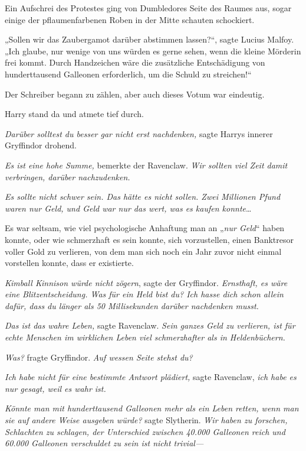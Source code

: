 {Ein Aufschrei des Protestes ging von Dumbledores Seite des Raumes aus, sogar einige der pflaumenfarbenen Roben in der Mitte schauten schockiert.

„Sollen wir das Zaubergamot darüber abstimmen lassen?“, sagte Lucius Malfoy. „Ich glaube, nur wenige von uns würden es gerne sehen, wenn die kleine Mörderin frei kommt. Durch Handzeichen wäre die zusätzliche Entschädigung von hunderttausend Galleonen erforderlich, um die Schuld zu streichen!“

Der Schreiber begann zu zählen, aber auch dieses Votum war eindeutig.

Harry stand da und atmete tief durch.

\emph{Darüber solltest du besser gar nicht erst nachdenken,} sagte Harrys innerer Gryffindor drohend.

\emph{Es ist eine hohe Summe,} bemerkte der Ravenclaw. \emph{Wir sollten viel Zeit damit verbringen, darüber nachzudenken.}

\emph{Es sollte nicht schwer sein. Das hätte es nicht sollen. Zwei Millionen Pfund waren nur Geld, und Geld war nur das wert, was es kaufen konnte}…

Es war seltsam, wie viel psychologische Anhaftung man an „\emph{nur Geld}“ haben konnte, oder wie schmerzhaft es sein konnte, sich vorzustellen, einen Banktresor voller Gold zu verlieren, von dem man sich noch ein Jahr zuvor nicht einmal vorstellen konnte, dass er existierte.

\emph{Kimball Kinnison würde nicht zögern}, sagte der Gryffindor. \emph{Ernsthaft, es wäre eine Blitzentscheidung. Was für ein Held bist du? Ich hasse dich schon allein dafür, dass du länger als 50 Millisekunden darüber nachdenken musst.}

\emph{Das ist das wahre Leben,} sagte Ravenclaw. \emph{Sein ganzes Geld zu verlieren, ist für echte Menschen im wirklichen Leben viel schmerzhafter als in Heldenbüchern.}

\emph{Was?} fragte Gryffindor. \emph{Auf wessen Seite stehst du?}

\emph{Ich habe nicht für eine bestimmte Antwort plädiert,} sagte Ravenclaw, \emph{ich habe es nur gesagt, weil es wahr ist.}

\emph{Könnte man mit hunderttausend Galleonen mehr als ein Leben retten, wenn man sie auf andere Weise ausgeben würde?} sagte Slytherin. \emph{Wir haben zu forschen, Schlachten zu schlagen, der Unterschied zwischen 40.000 Galleonen reich und 60.000 Galleonen verschuldet zu sein ist nicht trivial—}

}
